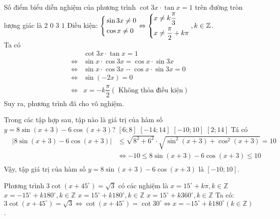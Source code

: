 \begin{ex}%
	Số điểm biểu diễn nghiệm của phương trình $\cot 3x \cdot \tan x=1$ trên đường tròn lượng giác là
	\choice
	{$2$}
	{\True $0$}
	{$3$}
	{$1$}
	\loigiai
	{ 
		Điều kiện: $\left\{\begin{aligned}&\sin 3x \ne 0 \\ & \cos x \ne 0\end{aligned}\right. \Leftrightarrow \left\{\begin{aligned}&x \ne k \dfrac{\pi}{3} \\ & x \ne \dfrac{\pi}{2} + k \pi\end{aligned}\right., k \in \mathbb{Z}$. \\
		Ta có \begin{eqnarray*}
			& & \cot 3x \cdot \tan x=1\\
			& \Leftrightarrow & \sin x \cdot \cos 3x = \cos x \cdot \sin 3x \\
			& \Leftrightarrow & \sin x \cdot \cos 3x - \cos x \cdot \sin 3x = 0 \\
			& \Leftrightarrow & \sin(-2x) = 0 \\
			& \Leftrightarrow & x = - k\dfrac{\pi}{2} (\text{ Không thỏa điều kiện})
		\end{eqnarray*}
		Suy ra, phương trình đã cho vô nghiệm.
	}
\end{ex}
\begin{ex}%
	Trong các tập hợp sau, tập nào là giá trị của hàm số $y=8 \sin (x+3)-6\cos (x+3)$?
	\choice
	{$[6;8]$}
	{$[-14;14]$}
	{\True $[-10;10]$}
	{$[2;14]$}
	\loigiai
	{ 
		Tá có 
		\begin{eqnarray*}
			& \left| 8 \sin (x+3)-6\cos (x+3) \right|  & \leq \sqrt{8^2 + 6^2} \cdot \sqrt{\sin^2 (x+3) + \cos^2 (x+3)} = 10\\
			& &\Leftrightarrow -10 \leq 8 \sin (x+3)-6\cos (x+3) \leq 10\\
		\end{eqnarray*}
		Vậy, tập giá trị của hàm số $y=8 \sin (x+3)-6\cos (x+3)$ là $[-10;10]$.
	}
\end{ex}
\begin{ex}%
	Phương trình $3\cot \left(x+45^\circ\right)=\sqrt{3}$ có các nghiệm là
	\choice
	{$x=15^\circ+k\pi, k \in \mathbb{Z}$}
	{\True $x=-15^\circ+k180^\circ, k \in \mathbb{Z}$}
	{$x=15^\circ+k180^\circ, k \in \mathbb{Z}$}
	{$x=15^\circ+k360^\circ, k \in \mathbb{Z}$}
	\loigiai
	{ 
		Ta có: $3\cot \left(x+45^\circ \right)=\sqrt{3} \Leftrightarrow \cot \left(x+ 45^\circ \right) = \cot 30^\circ \Leftrightarrow x = -15^\circ + k 180^\circ (k \in \mathbb{Z})$.
	}
\end{ex}

